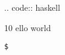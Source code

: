 \newcommand{\$}{\begin{verbatim}$\end{verbatim}}
\newenvironment{hs}[1]{.. code:: haskell\begin{indent!}{10}
}{\end{indent!}}


\begin{hs}
  hello world
\end{hs}

\$
